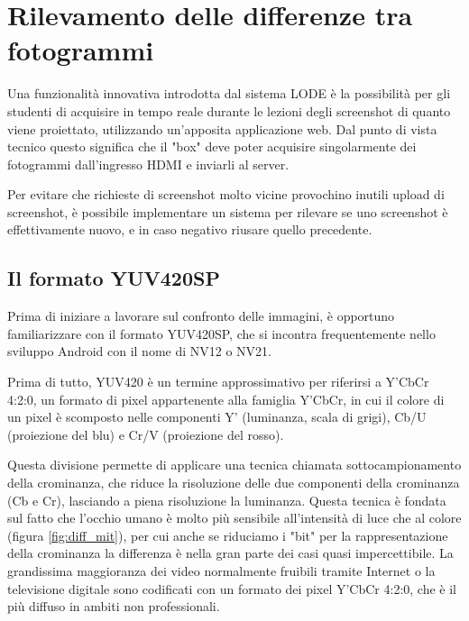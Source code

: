 \chapter{Rilevamento delle differenze tra fotogrammi}
\label{cha:diff}

Una funzionalità innovativa introdotta dal sistema LODE è la possibilità per gli studenti di acquisire in tempo reale durante le lezioni degli screenshot di quanto viene proiettato, utilizzando un'apposita applicazione web. Dal punto di vista tecnico questo significa che il "box" deve poter acquisire singolarmente dei fotogrammi dall'ingresso HDMI e inviarli al server.

Per evitare che richieste di screenshot molto vicine provochino inutili upload di screenshot, è possibile implementare un sistema per rilevare se uno screenshot è effettivamente nuovo, e in caso negativo riusare quello precedente.

\section{Il formato YUV420SP}
\label{sec:diff_yuv}

Prima di iniziare a lavorare sul confronto delle immagini, è opportuno familiarizzare con il formato YUV420SP, che si incontra frequentemente nello sviluppo Android con il nome di NV12 o NV21.

Prima di tutto, YUV420 è un termine approssimativo per riferirsi a Y'CbCr 4:2:0, un formato di pixel appartenente alla famiglia Y'CbCr, in cui il colore di un pixel è scomposto nelle componenti Y' (luminanza, scala di grigi\footnotemark{}), Cb/U (proiezione del blu) e Cr/V (proiezione del rosso).\cite{yuv}


Questa divisione permette di applicare una tecnica chiamata sottocampionamento della crominanza, che riduce la risoluzione delle due componenti della crominanza (Cb e Cr), lasciando a piena risoluzione la luminanza. Questa tecnica è fondata sul fatto che l'occhio umano è molto più sensibile all'intensità di luce che al colore (figura \ref{fig:diff_mit}), per cui anche se riduciamo i "bit" per la rappresentazione della crominanza la differenza è nella gran parte dei casi quasi impercettibile.\cite{luminance} La grandissima maggioranza dei video normalmente fruibili tramite Internet o la televisione digitale sono codificati con un formato dei pixel Y'CbCr 4:2:0, che è il più diffuso in ambiti non professionali.

